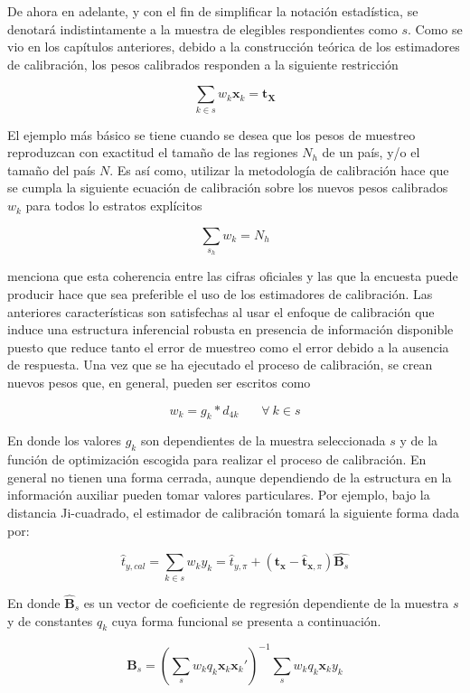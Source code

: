 \documentclass[
  12pt,
]{book}
\begin{document}
De ahora en adelante, y con el fin de simplificar la notación estadística, se denotará indistintamente a la muestra de elegibles respondientes como \(s\). Como se vio en los capítulos anteriores, debido a la construcción teórica de los estimadores de calibración, los pesos calibrados responden a la siguiente restricción

\[
\sum_{k\in s}w_k\mathbf{x}_k = \mathbf{t_X}
\]

El ejemplo más básico se tiene cuando se desea que los pesos de muestreo reproduzcan con exactitud el tamaño de las regiones \(N_h\) de un país, y/o el tamaño del país \(N\). Es así como, utilizar la metodología de calibración \citep{Deville_Sarndal_1992} hace que se cumpla la siguiente ecuación de calibración sobre los nuevos pesos calibrados \(w_k\) para todos lo estratos explícitos

\[
\sum_{s_h} w_k = N_h
\]

\citet{Gutierrez_2016} menciona que esta coherencia entre las cifras oficiales y las que la encuesta puede producir hace que sea preferible el uso de los estimadores de calibración. Las anteriores características son satisfechas al usar el enfoque de calibración que induce una estructura inferencial robusta en presencia de información disponible puesto que reduce tanto el error de muestreo como el error debido a la ausencia de respuesta. Una vez que se ha ejecutado el proceso de calibración, se crean nuevos pesos que, en general, pueden ser escritos como

\[
w_k = g_k * d_{4k}  \ \ \ \ \ \ \ \ \forall \ k \in s
\]

En donde los valores \(g_k\) son dependientes de la muestra seleccionada \(s\) y de la función de optimización escogida para realizar el proceso de calibración. En general no tienen una forma cerrada, aunque dependiendo de la estructura en la información auxiliar pueden tomar valores particulares. Por ejemplo, bajo la distancia Ji-cuadrado, el estimador de calibración tomará la siguiente forma dada por:

\[
\hat{t}_{y, cal} 
= \sum_{k\in s} w_k y_k 
= \hat{t}_{y, \pi} + ( \mathbf{t_x} - \hat{\mathbf{t}}_{\mathbf{x}, \pi}) \hat{\mathbf{B}_s}
\]

En donde \(\hat{\mathbf{B}}_s\) es un vector de coeficiente de regresión dependiente de la muestra \(s\) y de constantes \(q_k\) cuya forma funcional se presenta a continuación.

\[
\hat{\mathbf{B}}_s = \left(\sum_s w_k q_k \mathbf{x}_k\mathbf{x}_k'\right)^{-1}\sum_s w_k q_k \mathbf{x}_k y_k
\]
\end{document}
